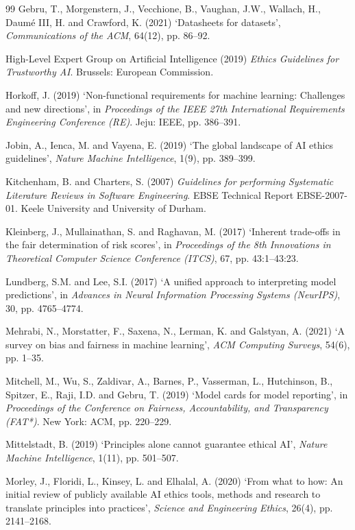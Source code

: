 \documentclass[11pt,a4paper]{article}
\begin{document}
\begin{thebibliography}{99}
Gebru, T., Morgenstern, J., Vecchione, B., Vaughan, J.W., Wallach, H., Daum\'{e} III, H. and Crawford, K. (2021) `Datasheets for datasets', \textit{Communications of the ACM}, 64(12), pp. 86--92.

High-Level Expert Group on Artificial Intelligence (2019) \textit{Ethics Guidelines for Trustworthy AI}. Brussels: European Commission.

Horkoff, J. (2019) `Non-functional requirements for machine learning: Challenges and new directions', in \textit{Proceedings of the IEEE 27th International Requirements Engineering Conference (RE)}. Jeju: IEEE, pp. 386--391.

Jobin, A., Ienca, M. and Vayena, E. (2019) `The global landscape of AI ethics guidelines', \textit{Nature Machine Intelligence}, 1(9), pp. 389--399.

Kitchenham, B. and Charters, S. (2007) \textit{Guidelines for performing Systematic Literature Reviews in Software Engineering}. EBSE Technical Report EBSE-2007-01. Keele University and University of Durham.

Kleinberg, J., Mullainathan, S. and Raghavan, M. (2017) `Inherent trade-offs in the fair determination of risk scores', in \textit{Proceedings of the 8th Innovations in Theoretical Computer Science Conference (ITCS)}, 67, pp. 43:1--43:23.

Lundberg, S.M. and Lee, S.I. (2017) `A unified approach to interpreting model predictions', in \textit{Advances in Neural Information Processing Systems (NeurIPS)}, 30, pp. 4765--4774.

Mehrabi, N., Morstatter, F., Saxena, N., Lerman, K. and Galstyan, A. (2021) `A survey on bias and fairness in machine learning', \textit{ACM Computing Surveys}, 54(6), pp. 1--35.

Mitchell, M., Wu, S., Zaldivar, A., Barnes, P., Vasserman, L., Hutchinson, B., Spitzer, E., Raji, I.D. and Gebru, T. (2019) `Model cards for model reporting', in \textit{Proceedings of the Conference on Fairness, Accountability, and Transparency (FAT*)}. New York: ACM, pp. 220--229.

Mittelstadt, B. (2019) `Principles alone cannot guarantee ethical AI', \textit{Nature Machine Intelligence}, 1(11), pp. 501--507.

Morley, J., Floridi, L., Kinsey, L. and Elhalal, A. (2020) `From what to how: An initial review of publicly available AI ethics tools, methods and research to translate principles into practices', \textit{Science and Engineering Ethics}, 26(4), pp. 2141--2168.


\end{thebibliography}
\end{document}
